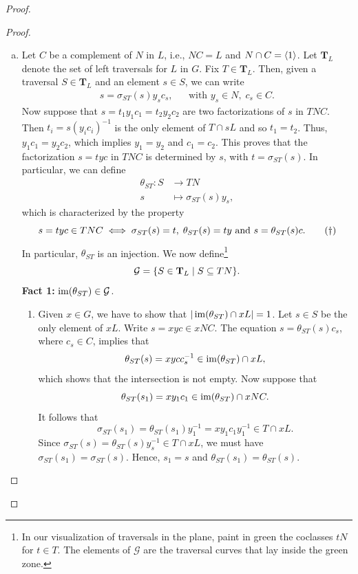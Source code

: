 \begin{proof}
\begin{proof}${}$
\begin{enumerate}[a),font=\upshape]
    \item Let $C$ be a complement of $N$ in $L$, i.e., $NC=L$ and $N\cap C=\langle1\rangle$. Let $\mathbf T_L$ denote the set of left traversals for $L$ in $G$. Fix $T\in\mathbf T_L$. Then, given a traversal $S\in\mathbf T_L$ and an element $s\in S$, we can write
    \begin{align}\label{eq.g1}
        s = \sigma_{ST}(s)y_sc_s,  &&\text{with }y_s\in N,\;c_s\in C.
    \end{align}
    Now suppose that $s=t_1y_1c_1=t_2y_2c_2$ are two factorizations of $s$ in $TNC$. Then $t_i=s(y_ic_i)^{-1}$ is the only element of $T\cap sL$ and so $t_1=t_2$. Thus, $y_1c_1=y_2c_2$, which implies $y_1=y_2$ and $c_1=c_2$. This proves that the factorization $s=tyc$ in $TNC$ is determined by $s$, with $t=\sigma_{ST}(s)$. In particular, we can define
    \begin{align}\label{eq.g2}
        \theta_{ST}\colon S&\to TN\\
        s&\mapsto\sigma_{ST}(s)y_s,\nonumber
    \end{align}
    which is characterized by the property
    \begin{equation}\label{eq.g3}
        s=tyc\in TNC \iff \sigma_{ST}(s)=t,\;\theta_{ST}(s)=ty \text{ and }s=\theta_{ST}(s)c.\tag{\text{$\dag$}}
    \end{equation}
    In particular, $\theta_{ST}$ is an injection. We now define\footnote{In our visualization of traversals in the plane, paint in green the coclasses $tN$ for $t\in T$. The elements of $\mathcal G$ are the traversal curves that lay inside the green zone.}
    $$
        \mathcal G = \{S\in\mathbf T_L\mid S\subseteq TN\}.
    $$
    \textbf{Fact 1:} $\operatorname{im}(\theta_{ST})\in\mathcal G$.
    
    {\small
    \begin{enumerate}
        \item[$\to$]
    Given $x\in G$, we have to show that $|\operatorname{im}(\theta_{ST})\cap xL|=1$. Let $s\in S$ be the only element of $xL$. Write $s=xyc\in xNC$. The equation $s=\theta_{ST}(s)c_s$, where $c_s\in C$, implies that
    $$
        \theta_{ST}(s)=xycc_s^{-1}\in\operatorname{im}(\theta_{ST})\cap xL,
    $$
    which shows that the intersection is not empty. Now suppose that
    $$
        \theta_{ST}(s_1)=xy_1c_1\in \operatorname{im}(\theta_{ST})\cap xNC.
    $$
    It follows that
    $$
        \sigma_{ST}(s_1) = \theta_{ST}(s_1)y_1^{-1}=xy_1c_1y_1^{-1}\in T\cap xL.
    $$
    Since $\sigma_{ST}(s)=\theta_{ST}(s)y_s^{-1}\in T\cap xL$, we must have $\sigma_{ST}(s_1)=\sigma_{ST}(s)$. Hence, $s_1=s$ and $\theta_{ST}(s_1)=\theta_{ST}(s)$.
    \end{enumerate}
    }


\end{enumerate}
\end{proof}
\end{proof}
